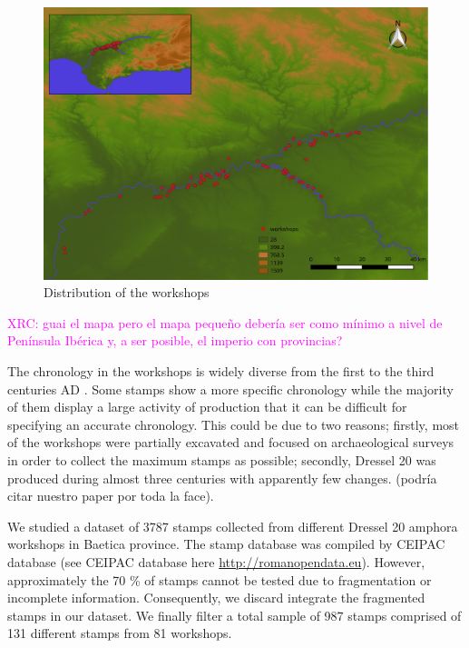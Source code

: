 \documentclass[review]{elsarticle}
\newcommand{\memo}[2]{\textcolor{#1}{#2}}
\newcommand{\xavi}[1]{\memo{magenta}{XRC: #1\\}}
\begin{document}
\begin{figure}[htp]
	\centering
\includegraphics[width=\linewidth]{figs/workshop}
\caption{Distribution of the workshops}
\label{workshop}
\end{figure} 

\xavi{guai el mapa pero el mapa pequeño debería ser como mínimo a nivel de Península Ibérica y, a ser posible, el imperio con provincias?}

The chronology in the workshops is widely diverse from the first to the third centuries AD \citep{millet_anforas_1998,rodriguez_baetican_1998,chic2005comercio}. Some stamps show a more specific chronology while the majority of them display a large activity of production that it can be difficult for specifying an accurate chronology. This could be due to two reasons; firstly, most of the workshops were partially excavated and focused on archaeological surveys in order to collect the maximum stamps as possible; secondly, Dressel 20 was produced during almost three centuries with apparently few changes. (podría citar nuestro paper por toda la face).
 
We studied a dataset of 3787 stamps collected from different Dressel 20 amphora workshops in Baetica province. The stamp database was compiled by CEIPAC database \citep{remesal_centro_2015} (see CEIPAC database here \url{http://romanopendata.eu}). However, approximately the 70 \% of stamps cannot be tested due to fragmentation or incomplete information. Consequently, we discard integrate the fragmented stamps in our dataset. We finally filter a total sample of 987 stamps comprised of 131 different stamps from 81 workshops. 
\end{document}
